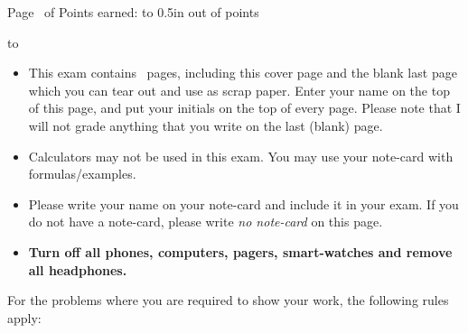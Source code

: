 \documentclass[10pt,answers]{exam}
\begin{document}
\extrawidth{-0.3in}
\pagestyle{headandfoot}

\setlength{\hoffset}{-.25in}

\extraheadheight{-.4in}
\runningheadrule
{} 



\firstpagefooter{\bfseries{}}{}{} 


\runningheader{\bfseries {}}%
              {\bfseries {}}%
              {Page \thepage\ 
							of \numpages 
							}
\runningfooter{} %
                {}
                {Points earned: \hbox to 0.5in{\hrulefill}
                 out of  \pointsonpage{\thepage} points}
                 
						

\vspace*{0.7cm}
\hbox to 
\vspace{0.2in}

\begin{itemize}
	\item This exam contains \numpages\ pages, including this cover page and the blank last page which you can tear out and use as scrap paper. Enter
your name on the top of this page, and put your initials
on the top of every page. Please note that I will not grade anything that you write on the last (blank) page.


\item Calculators may not be used in this exam. You may use your note-card with formulas/examples. 

\item Please write your name on your note-card and include it in your exam. If you do not have a note-card, please write {\textit {no note-card}} on this page.
\item {\bfseries{Turn off all phones, computers, pagers,  smart-watches and remove all headphones.}}

\end{itemize}

For the problems where you are required to show your work, the following rules apply:\\
\end{document}
